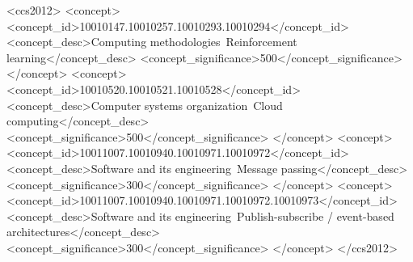 \documentclass[manuscript,nonacm]{acmart}
\begin{document}
\begin{abstract}
In a locked scale-out simulator experiment, 20,000 subscriptions carry 775
million queued events on ten connections established on one Pod. Across 20
paired seeds, adding three Pods with unchanged connection placement yields
58,000 events/s. Probe-guided DQL and guarded-greedy migration yield 219,762
and 221,260 events/s, respectively. DQL reduces normalized backlog area by
12.30\% relative to unchanged placement (paired difference $-0.117504$;
95\% confidence interval $[-0.121210,-0.113345]$). The comparison establishes
the value of connection reassociation under the stated service model.
In a separate mixed-workload holdout, DQL improves mean composite reward by
0.0318 and reduces subscription-count variance by 90.0\% relative to the
two-dimensional heuristic, with a 4.5\% throughput tradeoff. Oracle Cloud
experiments establish execution of the mechanism: ten connection replacements
reassociate 4,000 of 20,000 subscriptions, and a loaded scale-out trial completes
three selective handoffs while retaining the other sessions and confirming
all 8,000 observed delivery ACKs. The framework therefore offers both a
transparent greedy policy and a learned multi-objective policy, with their
benefits evaluated separately from the shared handoff mechanism.
\end{abstract}

\begin{CCSXML}
<ccs2012>
 <concept>
  <concept_id>10010147.10010257.10010293.10010294</concept_id>
  <concept_desc>Computing methodologies~Reinforcement learning</concept_desc>
  <concept_significance>500</concept_significance>
 </concept>
 <concept>
  <concept_id>10010520.10010521.10010528</concept_id>
  <concept_desc>Computer systems organization~Cloud computing</concept_desc>
  <concept_significance>500</concept_significance>
 </concept>
 <concept>
  <concept_id>10011007.10010940.10010971.10010972</concept_id>
  <concept_desc>Software and its engineering~Message passing</concept_desc>
  <concept_significance>300</concept_significance>
 </concept>
 <concept>
  <concept_id>10011007.10010940.10010971.10010972.10010973</concept_id>
  <concept_desc>Software and its engineering~Publish-subscribe / event-based architectures</concept_desc>
  <concept_significance>300</concept_significance>
 </concept>
</ccs2012>
\end{CCSXML}
\end{document}
